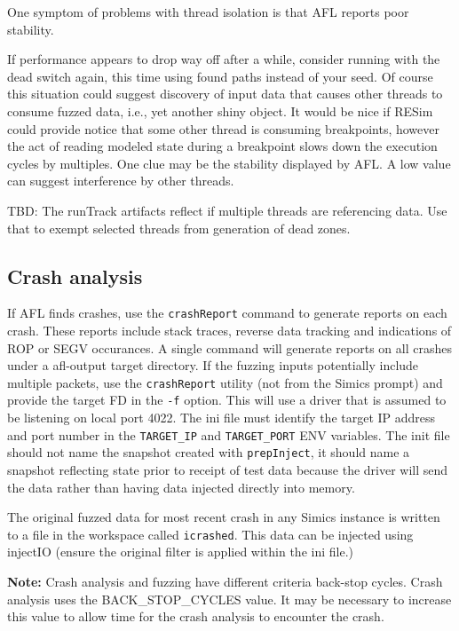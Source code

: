 \documentclass[titlepage]{article}
\begin{document}
One symptom of problems with thread isolation is that AFL reports poor stability.

If performance appears to drop way off after a while, consider running with the dead switch again, this time using found paths instead of your seed.  Of course
this situation could suggest discovery of input data that causes other threads to consume fuzzed data, i.e., yet another shiny object.
It would be nice if RESim could provide notice that some other thread is consuming breakpoints, however the act of reading modeled state during a 
breakpoint slows down the execution cycles by multiples.  One clue may be the stability displayed by AFL.  A low value can suggest interference by other threads.

TBD: The runTrack artifacts reflect if multiple threads are referencing data. Use that to exempt selected threads from generation of dead zones.

\subsection{Crash analysis}
If AFL finds crashes, use the {\tt crashReport} command to generate reports on each crash.  These reports include stack traces, reverse
data tracking and indications of ROP or SEGV occurances.  A single command will generate reports on all crashes under a afl-output target
directory.  If the fuzzing inputs potentially include multiple packets, use the {\tt crashReport} utility (not from the Simics prompt) and provide
the target FD in the {\tt -f} option.  This will use a driver that is assumed to be listening on local port 4022.  The ini file must identify the target IP
address and port number in the {\tt TARGET\_IP} and {\tt TARGET\_PORT} ENV variables.  The init file should not name the snapshot created with {\tt prepInject},
it should name a snapshot reflecting state prior to receipt of test data because the driver will send the data rather than having data injected directly into 
memory.

The original fuzzed data for most recent crash in any Simics instance is written to a file in the workspace called {\tt icrashed}.  This data can be injected using
injectIO (ensure the original filter is applied within the ini file.)

\textbf{Note:} Crash analysis and fuzzing have different criteria back-stop cycles.  Crash analysis uses the BACK\_STOP\_CYCLES value.  It may be necessary to increase this 
value to allow time for the crash analysis to encounter the crash.
\end{document}
